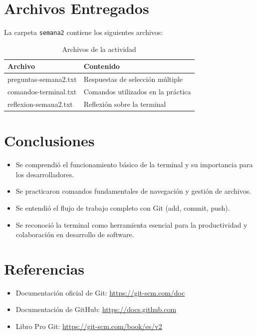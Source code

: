 \documentclass[12pt,a4paper]{article}
\begin{document}
\section{Archivos Entregados}

La carpeta \texttt{semana2} contiene los siguientes archivos:

\begin{table}[h]
\centering
\begin{tabular}{|l|l|}
\hline
\textbf{Archivo} & \textbf{Contenido} \\
\hline
preguntas-semana2.txt & Respuestas de selección múltiple \\
\hline
comandos-terminal.txt & Comandos utilizados en la práctica \\
\hline
reflexion-semana2.txt & Reflexión sobre la terminal \\
\hline
\end{tabular}
\caption{Archivos de la actividad}
\end{table}

\section{Conclusiones}

\begin{itemize}
    \item Se comprendió el funcionamiento básico de la terminal y su importancia para los desarrolladores.
    \item Se practicaron comandos fundamentales de navegación y gestión de archivos.
    \item Se entendió el flujo de trabajo completo con Git (add, commit, push).
    \item Se reconoció la terminal como herramienta esencial para la productividad y colaboración en desarrollo de software.
\end{itemize}

\section{Referencias}

\begin{itemize}
    \item Documentación oficial de Git: \url{https://git-scm.com/doc}
    \item Documentación de GitHub: \url{https://docs.github.com}
    \item Libro Pro Git: \url{https://git-scm.com/book/es/v2}
\end{itemize}
\end{document}
